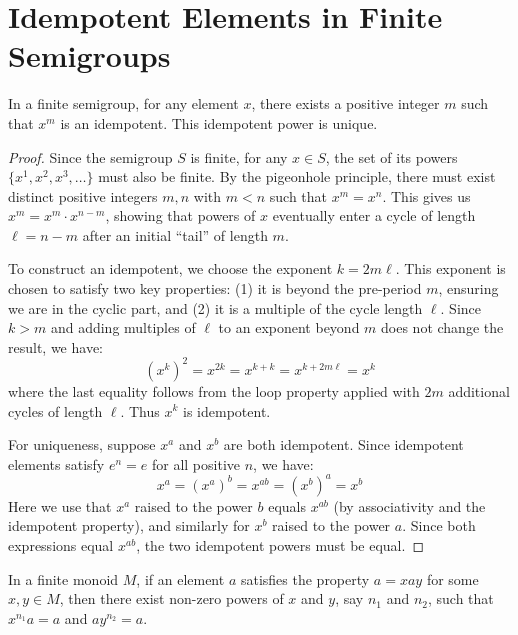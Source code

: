 \chapter{Idempotent Elements in Finite Semigroups}


\begin{lemma}
\label{lem:exists-unique-idempotent-pow}
In a finite semigroup, for any element $x$, there exists a positive integer $m$ such that $x^m$ is an idempotent. This idempotent power is unique. 
\leanok
\end{lemma}

\begin{proof}
\leanok
Since the semigroup $S$ is finite, for any $x \in S$, the set of its powers $\{x^1, x^2, x^3, \dots\}$ must also be finite. By the pigeonhole principle, there must exist distinct positive integers $m, n$ with $m < n$ such that $x^m = x^n$. This gives us $x^m = x^m \cdot x^{n-m}$, showing that powers of $x$ eventually enter a cycle of length $\ell = n - m$ after an initial ``tail'' of length $m$.

To construct an idempotent, we choose the exponent $k = 2m\ell$. This exponent is chosen to satisfy two key properties: (1) it is beyond the pre-period $m$, ensuring we are in the cyclic part, and (2) it is a multiple of the cycle length $\ell$. Since $k > m$ and adding multiples of $\ell$ to an exponent beyond $m$ does not change the result, we have:
\[
(x^k)^2 = x^{2k} = x^{k + k} = x^{k + 2m\ell} = x^k
\]
where the last equality follows from the loop property applied with $2m$ additional cycles of length $\ell$. Thus $x^k$ is idempotent.

For uniqueness, suppose $x^a$ and $x^b$ are both idempotent. Since idempotent elements satisfy $e^n = e$ for all positive $n$, we have:
\[
x^a = (x^a)^b = x^{ab} = (x^b)^a = x^b
\]
Here we use that $x^a$ raised to the power $b$ equals $x^{ab}$ (by associativity and the idempotent property), and similarly for $x^b$ raised to the power $a$. Since both expressions equal $x^{ab}$, the two idempotent powers must be equal.
\end{proof}

\begin{lemma}
\label{lem:exists-pow-sandwich}
In a finite monoid $M$, if an element $a$ satisfies the property $a = xay$ for some $x, y \in M$, then there exist non-zero powers of $x$ and $y$, say $n_1$ and $n_2$, such that $x^{n_1}a = a$ and $ay^{n_2} = a$.
\leanok
{}
\end{lemma}

